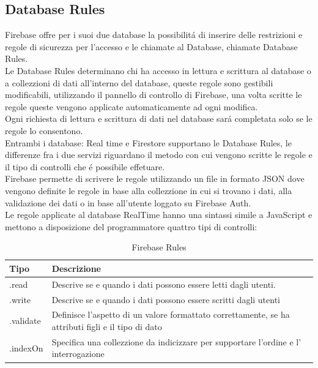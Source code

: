 \subsection{Database Rules}                 %
Firebase offre per i suoi due database la possibilit\'a di inserire delle restrizioni e regole di sicurezza per l'accesso e le chiamate al Database, chiamate Database Rules.\\
Le Database Rules determinano chi ha accesso in lettura e scrittura al database o a collezzioni di dati all'interno del database, queste regole sono gestibili modificabili, utilizzando il pannello di controllo di Firebase, una volta scritte le regole queste vengono applicate automaticamente ad ogni modifica. \\
Ogni richiesta di lettura e scrittura di dati nel database sar\'a completata solo se le regole lo consentono.\\
Entrambi i database: Real time e Firestore supportano le Database Rules, le differenze fra i due servizi riguardano il metodo con cui vengono scritte le regole e il tipo di controlli che \'e possibile effetuare.\\
Firebase permette di scrivere le regole utilizzando un file in formato JSON dove vengono definite le regole in base alla collezzione in cui si trovano i dati, alla validazione dei dati o in base all'utente loggato su Firebase Auth.\\
Le regole applicate al database RealTime hanno una sintassi simile a JavaScript e mettono a disposizione del programmatore quattro tipi di controlli:

\begin{table}[h]
\begin{center}
\begin{tabular}{|p{2cm}|p{12cm}|}
    \hline
    {\textbf{Tipo}} & {\textbf{Descrizione}} \\ \hline
    .read & Descrive se e quando i dati possono essere letti dagli utenti.\\ \hline
    .write & Descrive se e quando i dati possono essere scritti dagli utenti\\ \hline
     .validate & Definisce l'aspetto di un valore formattato correttamente, se ha attributi figli e il tipo di dato\\ \hline
    .indexOn & Specifica una collezzione da indicizzare per supportare l'ordine e l' interrogazione\\ \hline
\end{tabular}
\caption[Firbase Rules ]{Firebase Rules}\label{tab:Firebase Rules}
\end{center}
\end{table}

